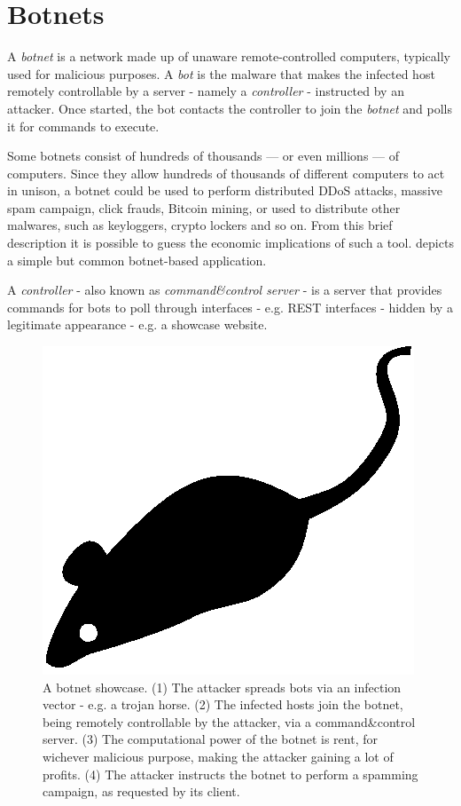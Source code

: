 \section{Botnets}
\label{sec:botnets}

A \textit{botnet} is a network made up of unaware remote-controlled computers, typically used for malicious purposes.
A \textit{bot} is the malware that makes the infected host remotely controllable by a server - namely a \textit{controller} -  instructed by an attacker. Once started, the bot contacts the controller to join the \textit{botnet} and polls it for commands to execute.

Some botnets consist of hundreds of thousands — or even millions — of computers. Since they allow hundreds of thousands of different computers to act in unison, a botnet could be used to perform distributed DDoS attacks, massive spam campaign, click frauds, Bitcoin mining, or used to distribute other malwares, such as keyloggers, crypto lockers and so on. From this brief description it is possible to guess the economic implications of such a tool.  depicts a simple but common botnet-based application.

A \textit{controller} - also known as \textit{command\&control server} - is a server that provides commands for bots to poll through interfaces - e.g. REST interfaces - hidden by a legitimate appearance - e.g. a showcase website.

\begin{figure}[tp]
  \centering
  \includegraphics{./fig/acmlarge-mouse}
  \caption{A botnet showcase. (1) The attacker spreads bots via an infection vector - e.g. a trojan horse. (2) The infected hosts join the botnet, being remotely controllable by the attacker, via a command\&control server. (3) The computational power of the botnet is rent, for wichever malicious purpose, making the attacker gaining a lot of profits. (4) The attacker instructs the botnet to perform a spamming campaign, as requested by its client.}
    \label{fig:botnet-showcase}
\end{figure}

